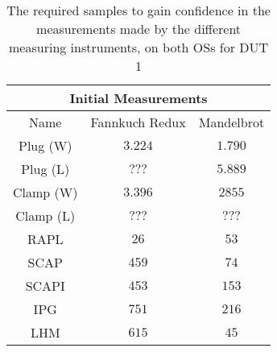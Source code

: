 \begin{table}[H]
    \centering
    \begin{tabular}{|| c | c | c ||}
    \hline
    \multicolumn{3}{||c||}{Initial Measurements} \\ [0.5ex] \hline\hline
    Name & Fannkuch Redux & Mandelbrot \\\hline
    Plug (W) & $3.224$ & $1.790$ \\
    Plug (L) & $???$ & $5.889$ \\
    Clamp (W) & $3.396$ & $2855$ \\
    Clamp (L) & $???$ & $???$ \\
    RAPL & $26$ & $53$ \\
    SCAP & $459$ & $74$ \\
    SCAPI & $453$ & $153$ \\
    IPG & $751$ & $216$ \\
    LHM & $615$ & $45$ \\\hline
    \end{tabular}
    \caption{The required samples to gain confidence in the measurements made by the different measuring instruments, on both OSs for DUT 1}
    \label{tab:initial-measurements-exp-2-dut-1}
\end{table}